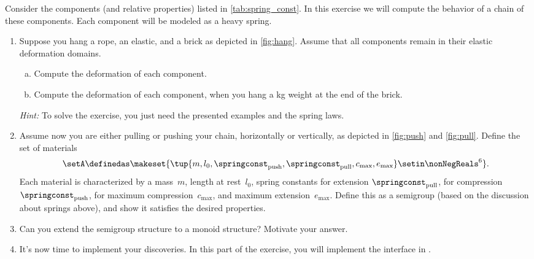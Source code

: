 \begin{gradedexercise}
    \label{ex:Goldberg}
    Consider the components (and relative properties) listed in \cref{tab:spring_const}.
    In this exercise we will compute the behavior of a chain of these components.
    Each component will be modeled as a heavy spring.
    \begin{enumerate}
        \item Suppose you hang a rope, an elastic, and a brick as depicted in \cref{fig:hang}.
        Assume that all components remain in their elastic deformation domains.
        \begin{enumerate}[(a)]
            \item Compute the deformation of each component.
            \item Compute the deformation of each component, when you hang a \unit[1]{kg} weight at the end of the brick.
        \end{enumerate}
        \emph{Hint:}
        To solve the exercise, you just need the presented examples and the spring laws.
        \item Assume now you are either pulling or pushing your chain, horizontally or vertically, as depicted in \cref{fig:push} and \cref{fig:pull}.
        Define the set of materials
        \begin{equation}
            \setA\definedas \makeset{ \tup{m,l_0, \springconst_\mathrm{push},\springconst_\mathrm{pull}, c_\mathrm{max}, e_\mathrm{max}} \setin \nonNegReals^6}.
        \end{equation}
        Each material is characterized by a mass~$m$, length at rest~$l_0$, spring constants for extension $\springconst_\mathrm{pull}$, for compression~$\springconst_\mathrm{push}$, for maximum compression~$c_\mathrm{max}$, and maximum extension~$e_\mathrm{max}$.
        Define this as a semigroup (based on the discussion about springs above), and show it satisfies the desired properties.
        \item Can you extend the semigroup structure to a monoid structure?
        Motivate your answer.
        \item It's now time to implement your discoveries.
        In this part of the exercise, you will implement the interface in .


\end{enumerate}
\end{gradedexercise}
